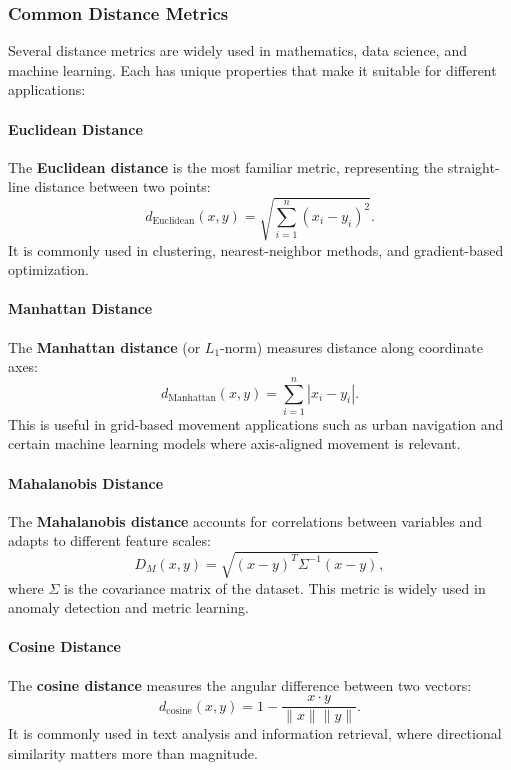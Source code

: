 
\subsubsection{Common Distance Metrics}

Several distance metrics are widely used in mathematics, data science, and machine learning. Each has unique properties that make it suitable for different applications:

\paragraph{Euclidean Distance}
The \textbf{Euclidean distance} is the most familiar metric, representing the straight-line distance between two points:
\[
    d_{\text{Euclidean}}(x, y) = \sqrt{\sum_{i=1}^{n} (x_i - y_i)^2}.
\]
It is commonly used in clustering, nearest-neighbor methods, and gradient-based optimization.

\paragraph{Manhattan Distance}
The \textbf{Manhattan distance} (or \( L_1 \)-norm) measures distance along coordinate axes:
\[
    d_{\text{Manhattan}}(x, y) = \sum_{i=1}^{n} |x_i - y_i|.
\]
This is useful in grid-based movement applications such as urban navigation and certain machine learning models where axis-aligned movement is relevant.

\paragraph{Mahalanobis Distance}
The \textbf{Mahalanobis distance} accounts for correlations between variables and adapts to different feature scales:
\[
    D_M(x, y) = \sqrt{(x - y)^T \Sigma^{-1} (x - y)},
\]
where \( \Sigma \) is the covariance matrix of the dataset. This metric is widely used in anomaly detection and metric learning.


\paragraph{Cosine Distance}
The \textbf{cosine distance} measures the angular difference between two vectors:
\[
    d_{\text{cosine}}(x, y) = 1 - \frac{x \cdot y}{\|x\| \|y\|}.
\]
It is commonly used in text analysis and information retrieval, where directional similarity matters more than magnitude.

